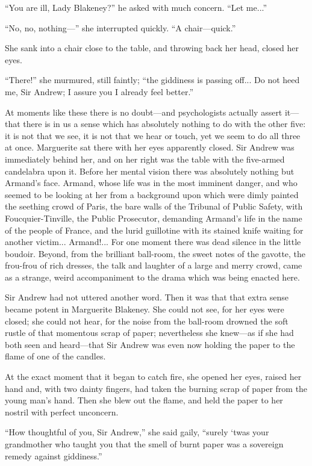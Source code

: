 \documentclass[paper=5.5in:8.5in,BCOR=7mm,twoside,DIV=calc,12pt,usegeometry,chapterprefix,endperiod,headings=big]{scrbook}
\begin{document}
\enquote{You are ill, Lady Blakeney?} he asked with much concern. \enquote{Let me...}

\enquote{No, no, nothing---} she interrupted quickly. \enquote{A chair---quick.}

She sank into a chair close to the table, and throwing back her head, closed her eyes.

\enquote{There!} she murmured, still faintly; \enquote{the giddiness is passing off... Do not heed me, Sir Andrew; I assure you I already feel better.}

At moments like these there is no doubt---and psychologists actually assert it---that there is in us a sense which has absolutely nothing to do with the other five: it is not that we see, it is not that we hear or touch, yet we seem to do all three at once. Marguerite sat there with her eyes apparently closed. Sir Andrew was immediately behind her, and on her right was the table with the five-armed candelabra upon it. Before her mental vision there was absolutely nothing but Armand's face. Armand, whose life was in the most imminent danger, and who seemed to be looking at her from a background upon which were dimly painted the seething crowd of Paris, the bare walls of the Tribunal of Public Safety, with Foucquier-Tinville, the Public Prosecutor, demanding Armand's life in the name of the people of France, and the lurid guillotine with its stained knife waiting for another victim... Armand!... For one moment there was dead silence in the little boudoir. Beyond, from the brilliant ball-room, the sweet notes of the gavotte, the frou-frou of rich dresses, the talk and laughter of a large and merry crowd, came as a strange, weird accompaniment to the drama which was being enacted here.

Sir Andrew had not uttered another word. Then it was that that extra sense became potent in Marguerite Blakeney. She could not see, for her eyes were closed; she could not hear, for the noise from the ball-room drowned the soft rustle of that momentous scrap of paper; nevertheless she knew---as if she had both seen and heard---that Sir Andrew was even now holding the paper to the flame of one of the candles.

At the exact moment that it began to catch fire, she opened her eyes, raised her hand and, with two dainty fingers, had taken the burning scrap of paper from the young man's hand. Then she blew out the flame, and held the paper to her nostril with perfect unconcern.

\enquote{How thoughtful of you, Sir Andrew,} she said gaily, \enquote{surely `twas your grandmother who taught you that the smell of burnt paper was a sovereign remedy against giddiness.}
\end{document}

